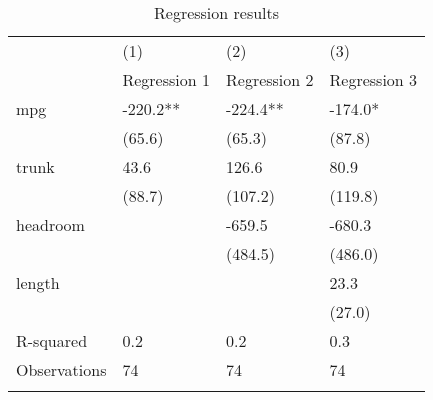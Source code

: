\documentclass{article}
\begin{document}
\begin{table}[tbp] \centering%
\caption{Regression results}%
\begin{tabularx}{\textwidth}{lCCC}
\toprule
&(1)&(2)&(3) \tabularnewline
&Regression 1&Regression 2&Regression 3 \tabularnewline
\midrule\addlinespace[1.5ex]
mpg&-220.2**&-224.4**&-174.0* \tabularnewline
&(65.6)&(65.3)&(87.8) \tabularnewline
trunk&43.6&126.6&80.9 \tabularnewline
&(88.7)&(107.2)&(119.8) \tabularnewline
headroom&&-659.5&-680.3 \tabularnewline
&&(484.5)&(486.0) \tabularnewline
length&&&23.3 \tabularnewline
&&&(27.0) \tabularnewline
\midrule R-squared&0.2&0.2&0.3 \tabularnewline
Observations&74&74&74 \tabularnewline
\bottomrule \addlinespace[1.5ex]
\end{tabularx}%
\end{table}%
\end{document}
